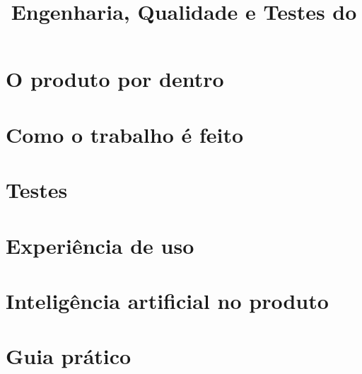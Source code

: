 \documentclass[11pt,a4paper,oneside]{report}
\title{Engenharia, Qualidade e Testes do \NomeDoProduto}
\author{\NomeDoAutor}
\begin{document}
\FazerCapa


\tableofcontents



\part{O produto por dentro}



\part{Como o trabalho é feito}



\part{Testes}





\part{Experiência de uso}




\part{Inteligência artificial no produto}


\part{Guia prático}


\appendix




\end{document}
